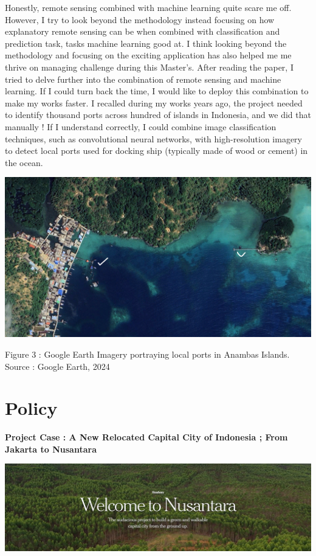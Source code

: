 \documentclass[
  letterpaper,
  DIV=11,
  numbers=noendperiod]{scrreprt}
\begin{document}
Honestly, remote sensing combined with machine learning quite scare me
off. However, I try to look beyond the methodology instead focusing on
how explanatory remote sensing can be when combined with classification
and prediction task, tasks machine learning good at. I think looking
beyond the methodology and focusing on the exciting application has also
helped me me thrive on managing challenge during this Master's. After
reading the paper, I tried to delve further into the combination of
remote sensing and machine learning. If I could turn back the time, I
would like to deploy this combination to make my works faster. I
recalled during my works years ago, the project needed to identify
thousand ports across hundred of islands in Indonesia, and we did that
manually ! If I understand correctly, I could combine image
classification techniques, such as convolutional neural networks, with
high-resolution imagery to detect local ports used for docking ship
(typically made of wood or cement) in the ocean.

\includegraphics{images/clipboard-2420843413.png}

Figure 3 : Google Earth Imagery portraying local ports in Anambas
Islands. Source : Google Earth, 2024


\hypertarget{policy}{%
\chapter{Policy}\label{policy}}

\textbf{Project Case : A New Relocated Capital City of Indonesia ; From
Jakarta to Nusantara}

\includegraphics[width=9.82292in,height=\textheight]{images/clipboard-546673402.png}
\end{document}
